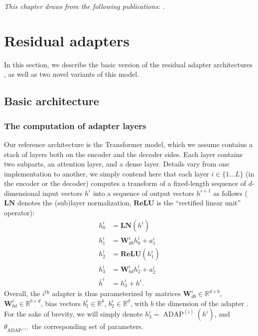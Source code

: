 \textit{This chapter draws from the following publications: \citet{Pham20Study}}.
\section{Residual adapters \label{sec:res-chap6}}
In this section, we describe the basic version of the residual adapter architectures \citep{houlsby19parameter, Bapna19simple}, as well as two novel variants of this model.

\subsection{Basic architecture \label{ssec:architecture-chap6}}

\subsubsection{The computation of adapter layers}
Our reference architecture is the Transformer model, which we assume contains a stack of layers both on the encoder and the decoder sides. Each layer contains two subparts, an attention layer, and a dense layer. Details vary from one implementation to another, we simply contend here that each layer $i \in \{1 \dots L\}$ (in the encoder or the decoder) computes a transform of a fixed-length sequence of $d$-dimensional input vectors $h^{i}$ into a sequence of output vectors $h^{i+1}$ as follows ($\mathbf{LN}$ denotes the (sub)layer normalization, $\mathbf{ReLU}$ is the ``rectified linear unit'' operator):
\begin{align*}
  h^{i}_0 &= \mathbf{LN}(h^{i}) \\
  h^{i}_1 &= \mathbf{W}_{db}^{i}h_0^{i} + a^i_{1} \\
  h^{i}_2 &= \mathbf{ReLU}(h_1^{i})
  \\
  h^{i}_3 &= \mathbf{W}_{bd}^{i}h_2^{i} + a^i_{2} \\
  \bar{h}^{i} &= h^{i}_3 + h^i.
\end{align*}
Overall, the  $i^{\text{th}}$ adapter is thus parameterized by matrices $\displaystyle{\mathbf{W}_{db}^{i}\in\mathbb{R}^{d\times b}}$,$\displaystyle{\mathbf{W}_{bd}^{i}\in\mathbb{R}^{b\times d}}$, bias vectors $\displaystyle{b^i_{1} \in \mathbb{R}^{b}}$, $\displaystyle{b^i_{2} \in \mathbb{R}^{d}}$, with $b$ the dimension of the adapter . For the sake of brevity, we will simply denote $h^{i}_3 = \operatorname{ADAP}^{(i)}(h^i)$, and $\theta_{\operatorname{ADAP}^{(i)}}$ the corresponding set of parameters.

